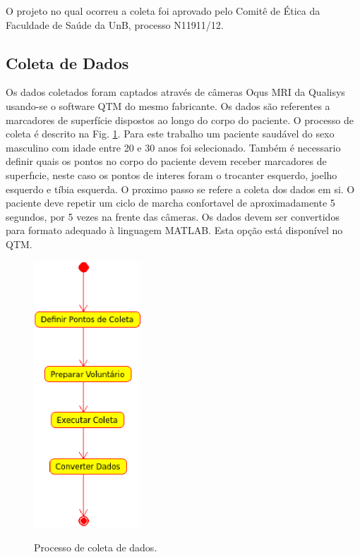 \documentclass[journal]{IEEEtran}
\begin{document}
O projeto no qual ocorreu a coleta foi aprovado pelo Comitê de Ética
da Faculdade de Saúde da UnB, processo N11911/12.

\subsection{Coleta de Dados}
Os dados coletados foram captados através de câmeras Oqus MRI da
Qualisys usando-se o software QTM do mesmo fabricante. 
Os dados são referentes a marcadores de superfície
dispostos ao longo do corpo do paciente.
O processo de coleta é descrito na Fig. \ref{coleta_dados}.
Para este trabalho um paciente saudável do sexo masculino com idade entre 20 e 30 anos
foi selecionado.
Também é necessario definir quais os pontos no corpo do paciente devem
receber marcadores de superfıcie, neste caso os pontos de interes foram o trocanter esquerdo, joelho esquerdo e tíbia esquerda. 
O proximo passo se refere a coleta dos dados em si. 
O paciente deve repetir um ciclo de marcha confortavel de aproximadamente 5 segundos,
por 5 vezes na frente das câmeras.
Os dados devem ser convertidos para formato adequado à linguagem
MATLAB. Esta opção está disponível no QTM. 
\begin{figure}[!t]
	\centering
	{\includegraphics[width=4cm]{coleta_dados}}
	\caption{Processo de coleta de dados.}
	\label{coleta_dados}
\end{figure}
\end{document}

